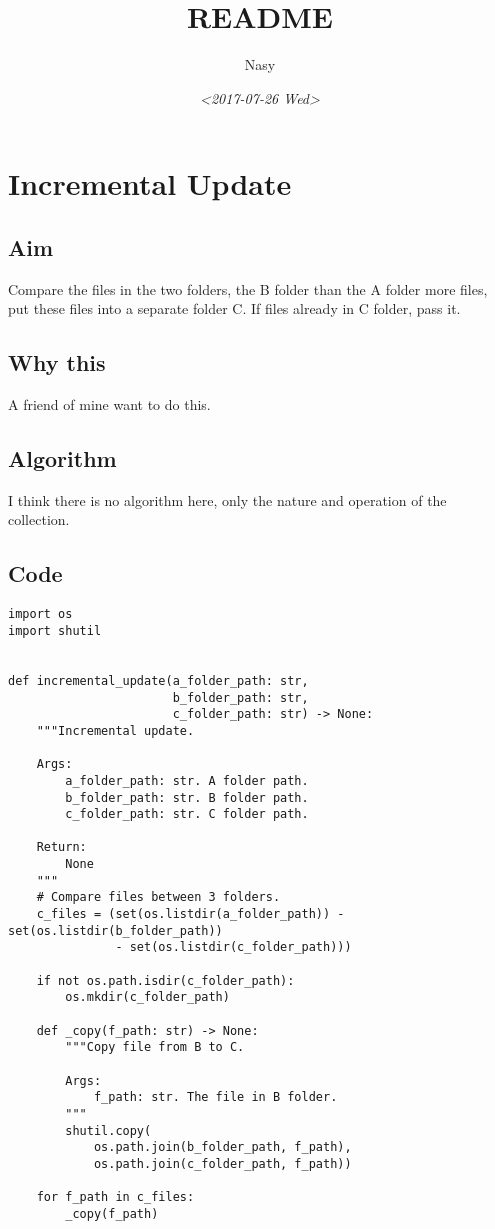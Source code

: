 \documentclass[11pt]{article}
\author{Nasy}
\date{\textit{<2017-07-26 Wed>}}
\title{README}
\begin{document}
\maketitle

\section{Incremental Update}
\label{sec-1}

\subsection{Aim}
\label{sec-1-1}
Compare the files in the two folders, the B folder than the A folder more files, put these files into a separate folder C. If files already in C folder, pass it.

\subsection{Why this}
\label{sec-1-2}
A friend of mine want to do this.

\subsection{Algorithm}
\label{sec-1-3}
I think there is no algorithm here, only the nature and operation of the collection.

\subsection{Code}
\label{sec-1-4}

\begin{verbatim}
import os
import shutil


def incremental_update(a_folder_path: str,
                       b_folder_path: str,
                       c_folder_path: str) -> None:
    """Incremental update.

    Args:
        a_folder_path: str. A folder path.
        b_folder_path: str. B folder path.
        c_folder_path: str. C folder path.

    Return:
        None
    """
    # Compare files between 3 folders.
    c_files = (set(os.listdir(a_folder_path)) - set(os.listdir(b_folder_path))
               - set(os.listdir(c_folder_path)))

    if not os.path.isdir(c_folder_path):
        os.mkdir(c_folder_path)

    def _copy(f_path: str) -> None:
        """Copy file from B to C.

        Args:
            f_path: str. The file in B folder.
        """
        shutil.copy(
            os.path.join(b_folder_path, f_path),
            os.path.join(c_folder_path, f_path))

    for f_path in c_files:
        _copy(f_path)
\end{verbatim}
\end{document}

